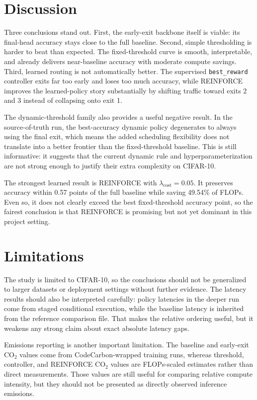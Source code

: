 \documentclass[10pt,twocolumn]{article}
\newcommand{\dataset}{CIFAR-10}
\begin{document}
\section{Discussion}

Three conclusions stand out. First, the early-exit backbone itself is viable: its final-head accuracy stays close to the full baseline. Second, simple thresholding is harder to beat than expected. The fixed-threshold curve is smooth, interpretable, and already delivers near-baseline accuracy with moderate compute savings. Third, learned routing is not automatically better. The supervised \texttt{best\_reward} controller exits far too early and loses too much accuracy, while REINFORCE improves the learned-policy story substantially by shifting traffic toward exits 2 and 3 instead of collapsing onto exit 1.

The dynamic-threshold family also provides a useful negative result. In the source-of-truth run, the best-accuracy dynamic policy degenerates to always using the final exit, which means the added scheduling flexibility does not translate into a better frontier than the fixed-threshold baseline. This is still informative: it suggests that the current dynamic rule and hyperparameterization are not strong enough to justify their extra complexity on \dataset{}.

The strongest learned result is REINFORCE with $\lambda_{\text{cost}} = 0.05$. It preserves accuracy within 0.57 points of the full baseline while saving 49.54\% of FLOPs. Even so, it does not clearly exceed the best fixed-threshold accuracy point, so the fairest conclusion is that REINFORCE is promising but not yet dominant in this project setting.

\section{Limitations}

The study is limited to \dataset{}, so the conclusions should not be generalized to larger datasets or deployment settings without further evidence. The latency results should also be interpreted carefully: policy latencies in the deeper run come from staged conditional execution, while the baseline latency is inherited from the reference comparison file. That makes the relative ordering useful, but it weakens any strong claim about exact absolute latency gaps.

Emissions reporting is another important limitation. The baseline and early-exit CO$_2$ values come from CodeCarbon-wrapped training runs, whereas threshold, controller, and REINFORCE CO$_2$ values are FLOPs-scaled estimates rather than direct measurements. Those values are still useful for comparing relative compute intensity, but they should not be presented as directly observed inference emissions.
\end{document}
